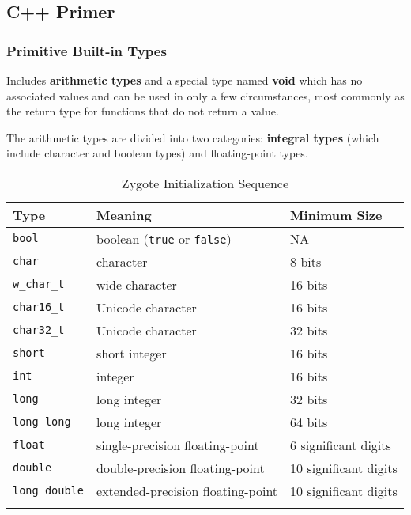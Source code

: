 \subsection{C++ Primer}
\label{task:20231114_cpp}

\subsubsection{Primitive Built-in Types}

Includes \textbf{arithmetic types} and a special type named \textbf{void} which has no associated values and can be used in only a few circumstances, most commonly as the return type for functions that do not return a value.

The arithmetic types are divided into two categories: \textbf{integral types} (which include character and boolean types) and floating-point types.

\begin{longtable}{p{.2\linewidth}  p{.40\linewidth} p{.3\linewidth}} 
\toprule
\textbf{Type} & \textbf{Meaning} & \textbf{Minimum Size}\\
\midrule

\texttt{bool} & boolean (\texttt{true} or \texttt{false}) & NA \\
\texttt{char} & character & 8 bits \\
\texttt{w\_char\_t} & wide character & 16 bits\\
\texttt{char16\_t} & Unicode character & 16 bits \\
\texttt{char32\_t} & Unicode character & 32 bits \\
\texttt{short} & short integer & 16 bits \\
\texttt{int} & integer & 16 bits \\
\texttt{long} & long integer & 32 bits \\
\texttt{long long} & long integer & 64 bits \\
\texttt{float} & single-precision floating-point & 6 significant digits \\
\texttt{double} & double-precision floating-point & 10 significant digits\\
\texttt{long double} & extended-precision floating-point & 10 significant digits \\

\midrule
\caption{Zygote Initialization Sequence} 
\label{tab:zygoteinitializationsequence}
\end{longtable}

